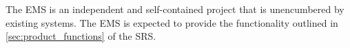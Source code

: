 The EMS is an independent and self-contained project that is unencumbered by
existing systems. The EMS is expected to provide the
functionality outlined in \autoref{sec:product_functions} of the SRS.
